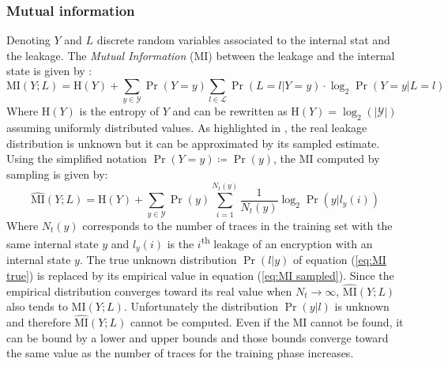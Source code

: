 \subsubsection{Mutual information}
Denoting $Y$ and $L$ discrete random variables associated to the internal 
stat and the leakage. The \textit{Mutual Information} (MI) between the 
leakage and the internal state is given by : 
\begin{equation}\label{eq:MI true}
    \text{MI}(Y;L) = \text{H}(Y) + 
\sum_{y\in\mathcal{Y}}\Pr(Y=y)\sum_{l\in\mathcal{L}}\Pr(L=l|Y=y)\cdot 
\log_2 \Pr(Y=y|L=l)
\end{equation}
Where $\text{H}(Y)$ is the entropy of $Y$ and can be rewritten as 
$\text{H}(Y) = \log_2(|\mathcal{Y}|)$ assuming uniformly distributed 
values.
As highlighted in \cite{boundPIHI}, the real leakage distribution is 
unknown but it can be approximated by its sampled estimate. Using the 
simplified notation $\Pr(Y=y)\coloneqq \Pr(y)$, the MI computed by 
sampling is given by:
\begin{equation}\label{eq:MI sampled}
    \hat{\text{MI}}(Y;L) = \text{H}(Y) + 
\sum_{y\in\mathcal{Y}}\Pr(y)\sum_{i=1}^{N_t(y)} 
\frac{1}{N_t(y)}\log_2\Pr(y|l_y(i))
\end{equation}
Where $N_t(y)$ corresponds to the number of traces in the training set 
with the same internal state $y$ and $l_y(i)$ is the 
$i$\textsuperscript{th} leakage of an encryption with an internal state 
$y$. The true unknown distribution $\Pr(l|y)$ of equation (\ref{eq:MI 
true}) is replaced by its empirical value in equation (\ref{eq:MI 
sampled}). Since the empirical distribution converges toward its real 
value when $N_t \rightarrow \infty$, $\hat{\text{MI}}(Y;L)$ also tends to 
$\text{MI}(Y;L)$. Unfortunately the distribution $\Pr(y|l)$ is unknown and 
therefore $\hat{\text{MI}}(Y;L)$ cannot be computed. Even if the MI cannot 
be found, it can be bound by a lower and upper bounds and those bounds 
converge toward the same value as the number of traces for the training 
phase increases.

